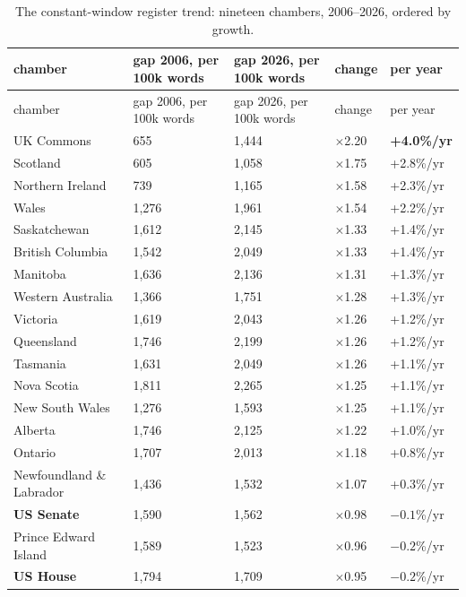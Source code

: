 \begingroup\small
\begin{longtable}[]{@{}lllll@{}}
\caption{The constant-window register trend: nineteen chambers, 2006--2026, ordered by growth.}\label{tab:climb}\\
\toprule\noalign{}
chamber & gap 2006, per 100k words & gap 2026, per 100k words & change & per year \\
\midrule\noalign{}
\endfirsthead
\toprule\noalign{}
chamber & gap 2006, per 100k words & gap 2026, per 100k words & change & per year \\
\midrule\noalign{}
\endhead
\bottomrule\noalign{}
\endlastfoot
UK Commons & 655 & 1,444 & \(\times\)2.20 & \textbf{+4.0\%/yr} \\
Scotland & 605 & 1,058 & \(\times\)1.75 & +2.8\%/yr \\
Northern Ireland & 739 & 1,165 & \(\times\)1.58 & +2.3\%/yr \\
Wales & 1,276 & 1,961 & \(\times\)1.54 & +2.2\%/yr \\
Saskatchewan & 1,612 & 2,145 & \(\times\)1.33 & +1.4\%/yr \\
British Columbia & 1,542 & 2,049 & \(\times\)1.33 & +1.4\%/yr \\
Manitoba & 1,636 & 2,136 & \(\times\)1.31 & +1.3\%/yr \\
Western Australia & 1,366 & 1,751 & \(\times\)1.28 & +1.3\%/yr \\
Victoria & 1,619 & 2,043 & \(\times\)1.26 & +1.2\%/yr \\
Queensland & 1,746 & 2,199 & \(\times\)1.26 & +1.2\%/yr \\
Tasmania & 1,631 & 2,049 & \(\times\)1.26 & +1.1\%/yr \\
Nova Scotia & 1,811 & 2,265 & \(\times\)1.25 & +1.1\%/yr \\
New South Wales & 1,276 & 1,593 & \(\times\)1.25 & +1.1\%/yr \\
Alberta & 1,746 & 2,125 & \(\times\)1.22 & +1.0\%/yr \\
Ontario & 1,707 & 2,013 & \(\times\)1.18 & +0.8\%/yr \\
Newfoundland \& Labrador & 1,436 & 1,532 & \(\times\)1.07 & +0.3\%/yr \\
\textbf{US Senate} & 1,590 & 1,562 & \(\times\)0.98 & \(-0.1\)\%/yr \\
Prince Edward Island & 1,589 & 1,523 & \(\times\)0.96 & \(-0.2\)\%/yr \\
\textbf{US House} & 1,794 & 1,709 & \(\times\)0.95 & \(-0.2\)\%/yr \\
\end{longtable}
\endgroup

